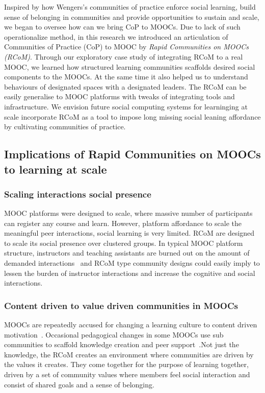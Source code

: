\documentclass[format=acmsmall, review=false, screen=true]{acmart}
\begin{document}
Inspired by how Wengers's communities of practice enforce social learning, build sense of belonging in communities and provide opportunities to sustain and scale, we began to oversee how can we bring CoP to MOOCs. Due to lack of such operationalize method, in this research we introduced an articulation of Communities of Practice (CoP) to MOOC by \textit{Rapid Communities on MOOCs (RCoM)}. Through our exploratory case study of integrating RCoM to a real MOOC, we learned how structured learning communities scaffolds desired social components to the MOOCs. At the same time it also helped us to understand behaviours of designated spaces with a designated leaders. The RCoM can be easily generalise to MOOC platforms with tweaks of integrating tools and infrastructure. We envision future social computing systems for learninging at scale incorporate RCoM as a tool to impose long missing social leaning affordance by cultivating communities of practice. 

\subsection{Implications of Rapid Communities on MOOCs to learning at scale}

\subsubsection{Scaling interactions social presence} 
MOOC platforms were designed to scale, where massive number of participants can register any course and learn. However, platform affordance to scale the meaningful peer interactions, social learning is very limited. RCoM are designed to scale its social presence over clustered groups. In typical MOOC platform structure, instructors and teaching assistants are burned out on the amount of demanded interactions~\cite{zheng2016ask} and RCoM type community designs could easily imply to lessen the burden of instructor interactions and increase the cognitive and social interactions. 

\subsubsection{Content driven to value driven communities in MOOCs} 
MOOCs are repeatedly accused for changing a learning culture to content driven motivation~\cite{wang2015content}. Occasional pedagogical changes in some MOOCs use sub communities to scaffold knowledge creation and peer support~\cite{sharif2015discussion}.Not just the knowledge, the RCoM creates an environment where communities are driven by the values it creates. They come together for the purpose of learning together, driven by a set of community values where members feel social interaction and consist of shared goals and a sense of belonging. 
\end{document}
